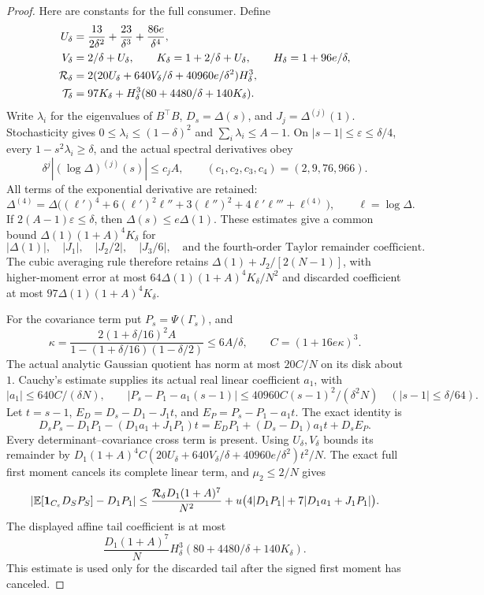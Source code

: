 \begin{proof}
Here are constants for the full consumer. Define
\[
 \begin{split}
 U_\delta&=\frac{13}{2\delta^2}+\frac{23}{\delta^3}
                                      +\frac{86e}{\delta^4},\\
 V_\delta&=2/\delta+U_\delta,\qquad
 K_\delta=1+2/\delta+U_\delta,\qquad H_\delta=1+96e/\delta,\\
 {\cal R}_\delta
   &=2(20U_\delta+640V_\delta/\delta+40960e/\delta^2)H_\delta^3,\\
 {\cal T}_\delta
   &=97K_\delta+
           H_\delta^3(80+4480/\delta+140K_\delta).
 \end{split}
\]
Write \(\lambda_i\) for the eigenvalues of \(B^\top B\),
\(D_s=\Delta(s)\), and \(J_j=\Delta^{(j)}(1)\).
Stochasticity gives \(0\le\lambda_i\le(1-\delta)^2\) and
\(\sum_i\lambda_i\le A-1\).
On \(|s-1|\le\varepsilon\le\delta/4\), every
\(1-s^2\lambda_i\ge\delta\), and the actual spectral derivatives obey
\[
 \delta^j|(\log\Delta)^{(j)}(s)|\le c_jA,\qquad
 (c_1,c_2,c_3,c_4)=(2,9,76,966).
\]
All terms of the exponential derivative are retained:
\[
 \Delta^{(4)}
 =\Delta\bigl((\ell')^4+6(\ell')^2\ell''
                +3(\ell'')^2+4\ell'\ell'''+\ell^{(4)}\bigr),
 \qquad \ell=\log\Delta .
\]
If \(2(A-1)\varepsilon\le\delta\), then
\(\Delta(s)\le e\Delta(1)\).
These estimates give a common bound
\(\Delta(1)(1+A)^4K_\delta\) for
\[
 |\Delta(1)|,\quad |J_1|,\quad |J_2/2|,\quad |J_3/6|,
 \quad\text{and the fourth-order Taylor remainder coefficient}.
\]
The cubic averaging rule therefore retains
\(\Delta(1)+J_2/[2(N-1)]\), with higher-moment error at most
\(64\Delta(1)(1+A)^4K_\delta/N^2\) and discarded coefficient
at most \(97\Delta(1)(1+A)^4K_\delta\).

For the covariance term put \(P_s=\Psi(\Gamma_s)\), and
\[
 \kappa=\frac{2(1+\delta/16)^2A}
                  {1-(1+\delta/16)(1-\delta/2)}\le6A/\delta,
 \qquad C=(1+16e\kappa)^3.
\]
The actual analytic Gaussian quotient has norm at most \(20C/N\)
on its disk about \(1\). Cauchy's estimate supplies its actual real
linear coefficient \(a_1\), with
\[
 |a_1|\le640C/(\delta N),\qquad
 |P_s-P_1-a_1(s-1)|
       \le40960C(s-1)^2/(\delta^2N)
       \quad (|s-1|\le\delta/64).
\]
Let \(t=s-1\), \(E_D=D_s-D_1-J_1t\), and
\(E_P=P_s-P_1-a_1t\). The exact identity is
\[
 D_sP_s-D_1P_1-(D_1a_1+J_1P_1)t
       =E_DP_1+(D_s-D_1)a_1t+D_sE_P.
\]
Every determinant--covariance cross term is present.
Using \(U_\delta,V_\delta\) bounds its remainder by
\(D_1(1+A)^4C(20U_\delta+640V_\delta/\delta
+40960e/\delta^2)t^2/N\).
The exact full first moment cancels its complete linear term, and
\(\mu_2\le2/N\) gives
\[
 \left|\mathbb E[\mathbf1_{C_\varepsilon}D_SP_S]-D_1P_1\right|
 \le\frac{{\cal R}_\delta D_1(1+A)^7}{N^2}
   +u\bigl(4|D_1P_1|+7|D_1a_1+J_1P_1|\bigr).
\]
The displayed affine tail coefficient is at most
\[
 \frac{D_1(1+A)^7}{N}
              H_\delta^3(80+4480/\delta+140K_\delta).
\]
This estimate is used only for the discarded tail after the signed
first moment has canceled.


\end{proof}
